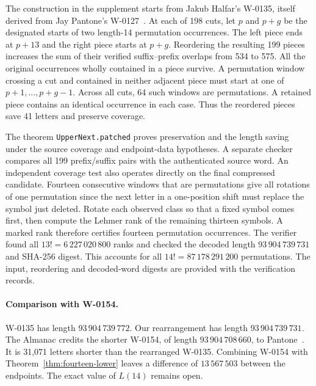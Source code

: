 \documentclass[11pt]{article}
\begin{document}
The construction in the supplement starts from Jakub Halfar's W-0135, itself derived from Jay Pantone's W-0127~\cite{almanac}. At each of 198 cuts, let $p$ and $p+g$ be the designated starts of two length-14 permutation occurrences. The left piece ends at $p+13$ and the right piece starts at $p+g$. Reordering the resulting 199 pieces increases the sum of their verified suffix--prefix overlaps from 534 to 575. All the original occurrences wholly contained in a piece survive. A permutation window crossing a cut and contained in neither adjacent piece must start at one of $p+1,\ldots,p+g-1$. Across all cuts, 64 such windows are permutations. A retained piece contains an identical occurrence in each case. Thus the reordered pieces save 41 letters and preserve coverage.

The theorem \texttt{UpperNext.patched} proves preservation and the length saving under the source coverage and endpoint-data hypotheses. A separate checker compares all 199 prefix/suffix pairs with the authenticated source word. An independent coverage test also operates directly on the final compressed candidate. Fourteen consecutive windows that are permutations give all rotations of one permutation since the next letter in a one-position shift must replace the symbol just deleted. Rotate each observed class so that a fixed symbol comes first, then compute the Lehmer rank of the remaining thirteen symbols. A marked rank therefore certifies fourteen permutation occurrences. The verifier found all $13!=6\,227\,020\,800$ ranks and checked the decoded length $93\,904\,739\,731$ and SHA-256 digest. This accounts for all $14!=87\,178\,291\,200$ permutations. The input, reordering and decoded-word digests are provided with the verification records.

\paragraph{Comparison with W-0154.}
W-0135 has length $93\,904\,739\,772$. Our rearrangement has length $93\,904\,739\,731$. The Almanac credits the shorter W-0154, of length $93\,904\,708\,660$, to Pantone~\cite{w154}. It is 31,071 letters shorter than the rearranged W-0135. Combining W-0154 with Theorem~\ref{thm:fourteen-lower} leaves a difference of $13\,567\,503$ between the endpoints. The exact value of $L(14)$ remains open.
\end{document}
